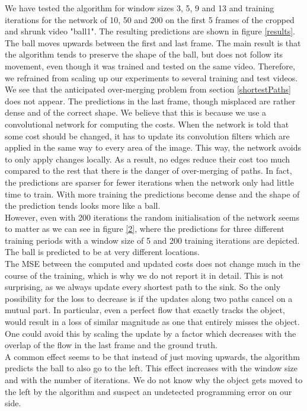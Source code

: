 \documentclass{article}
\begin{document}
We have tested the algorithm for window sizes 3, 5, 9 and 13 and training iterations for the network of 10, 50 and 200 on the first 5 frames of the cropped and shrunk video "ball1". The resulting predictions are shown in figure \ref{results}. The ball moves upwards between the first and last frame. The main result is that the algorithm tends to preserve the shape of the ball, but does not follow its movement, even though it was trained and tested on the same video. Therefore, we refrained from scaling up our experiments to several training and test videos.\\
We see that the anticipated over-merging problem from section \ref{shortestPaths} does not appear. The predictions in the last frame, though misplaced are rather dense and of the correct shape. We believe that this is because we use a convolutional network for computing the costs. When the network is told that some cost should be changed, it has to update its convolution filters which are applied in the same way to every area of the image. This way, the network avoids to only apply changes locally. As a result, no edges reduce their cost too much compared to the rest that there is the danger of over-merging of paths. In fact, the predictions are sparser for fewer iterations when the network only had little time to train. With more training the predictions become dense and the shape of the prediction tends looks more like a ball. \\
However, even with 200 iterations the random initialisation of the network seems to matter as we can see in figure \ref{2}, where the predictions for three different training periods with a window size of 5 and 200 training iterations are depicted. The ball is predicted to be at very different locations.\\
The MSE between the computed and updated costs does not change much in the course of the training, which is why we do not report it in detail. This is not surprising, as we always update every shortest path to the sink. So the only possibility for the loss to decrease is if the updates along two paths cancel on a mutual part. In particular, even a perfect flow that exactly tracks the object, would result in a loss of similar magnitude as one that entirely misses the object. One could avoid this by scaling the update by a factor which decreases with the overlap of the flow in the last frame and the ground truth.\\
A common effect seems to be that instead of just moving upwards, the algorithm predicts the ball to also go to the left. This effect increases with the window size and with the number of iterations. We do not know why the object gets moved to the left by the algorithm and suspect an undetected programming error on our side.\\
\end{document}

